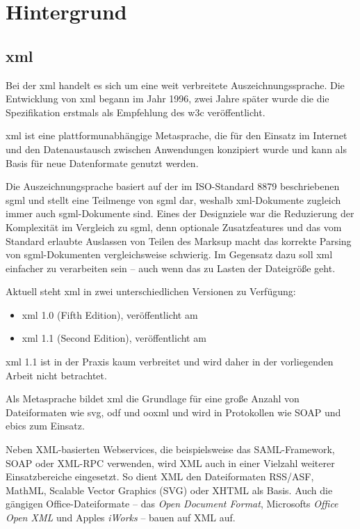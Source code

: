 \chapter{Hintergrund} \label{chap:background}

\section{\acrfull{xml}}

Bei der \acrfull{xml} handelt es sich um eine weit verbreitete Auszeichnungssprache. Die Entwicklung von \acrshort{xml} begann im Jahr 1996, zwei Jahre später wurde die die Spezifikation erstmals als Empfehlung des \acrshort{w3c} veröffentlicht.

\acrshort{xml} ist eine plattformunabhängige Metasprache, die für den Einsatz im Internet und den Datenaustausch zwischen Anwendungen konzipiert wurde und kann als Basis für neue Datenformate genutzt werden.

Die Auszeichnungsprache basiert auf der im ISO-Standard 8879 beschriebenen \acrfull{sgml} und stellt eine Teilmenge von \acrshort{sgml} dar, weshalb \acrshort{xml}-Dokumente zugleich immer auch \acrshort{sgml}-Dokumente sind. Eines der Designziele war die Reduzierung der Komplexität im Vergleich zu \acrshort{sgml}, denn optionale Zusatzfeatures und das vom Standard erlaubte Auslassen von Teilen des Marksup macht das korrekte Parsing von \acrshort{sgml}-Dokumenten vergleichsweise schwierig. Im Gegensatz dazu soll \acrshort{xml} einfacher zu verarbeiten sein -- auch wenn das zu Lasten der Dateigröße geht.\cite[Abschnitt 1.1]{maler2008xml,bray1998axml}

Aktuell steht \acrshort{xml} in zwei unterschiedlichen Versionen zu Verfügung:
\begin{itemize}
    \item{} \acrshort{xml} 1.0 (Fifth Edition), veröffentlicht am 
    \item{} \acrshort{xml} 1.1 (Second Edition), veröffentlicht am 
\end{itemize}

\acrshort{xml} 1.1 ist in der Praxis kaum verbreitet und wird daher in der vorliegenden Arbeit nicht betrachtet.

Als Metasprache bildet \acrshort{xml} die Grundlage für eine große Anzahl von Dateiformaten wie \gls{svg}, \gls{odf} und \gls{ooxml} und wird in Protokollen wie SOAP und \acrshort{ebics} zum Einsatz.

Neben XML-basierten Webservices, die beispielsweise das SAML-Framework, SOAP
oder XML-RPC verwenden, wird XML auch in einer Vielzahl weiterer
Einsatzbereiche eingesetzt. So dient XML den Dateiformaten RSS/ASF, MathML,
Scalable Vector Graphics (SVG) oder XHTML als Basis. Auch die gängigen
Office-Dateiformate -- das \emph{Open Document Format}, Microsofts %
\emph{Office Open XML} und Apples \emph{iWorks} -- bauen auf XML auf. %
